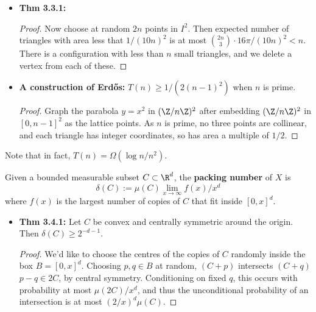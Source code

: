 \documentclass[11pt]{article}
\newenvironment{INT}[1][]{\begin{itemize}\small\item\textbf{#1}}{\end{itemize}}
\newcommand{\moreINT}[1][]{\item\textbf{#1}}
\begin{document}
\begin{chapter3}
\begin{itemise}
\begin{INT}[Thm 3.3.1:]
\begin{proof}
\INDENT Now choose at random $2n$ points in $I^2$. Then expected number of triangles with area less that $1/(10n)^2$ is at most ${2n\choose3}\cdot16\pi/(10n)^2<n$. There is a configuration with less than $n$ small triangles, and we delete a vertex from each of these.
\end{proof}
\moreINT[A construction of Erd\H{o}s:] $T(n)\geq1/(2(n-1)^2)$ when $n$ is prime.

\begin{proof} Graph the parabola $y=x^2$ in $(\Z/n\Z)^2$ after embedding $(\Z/n\Z)^2$ in $[0,n-1]^2$ as the lattice points. As $n$ is prime, no three points are collinear, and each triangle has integer coordinates, so has area a multiple of $1/2$.
\end{proof}
\end{INT}
Note that in fact, $T(n)=\Omega(\log n/n^2)$.
\item Given a bounded measurable subset $C\subset \R^d$, the \textbf{packing number} of $X$ is 
\[\delta(C):=\mu(C)\lim_{x\rightarrow\infty} f(x)/x^d\]
where $f(x)$ is the largest number of copies of $C$ that fit inside $[0,x]^d$.
\begin{INT}[Thm 3.4.1:]
Let $C$ be convex and centrally symmetric around the origin. Then $\delta(C)\geq2^{-d-1}$.
\begin{proof}
We'd like to choose the centres of the copies of $C$ randomly inside the box $B=[0,x]^d$. Choosing $p,q\in B$ at random, $(C+p)$ intersects $(C+q)$ \Iff $p-q\in2C$, by central symmetry. Conditioning on fixed $q$, this occurs with probability at most $\mu(2C)/x^{d}$, and thus the unconditional probability of an intersection is at most $(2/x)^d\mu(C)$.


\end{proof}
\end{INT}
\end{itemise}
\end{chapter3}
\end{document}
